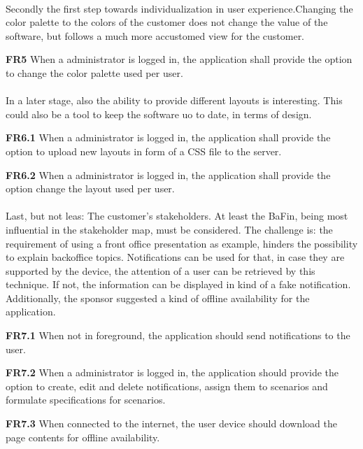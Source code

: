 \paragraph{} Secondly the first step towards individualization in user experience.Changing the color palette to the colors of the customer does not change the value of the software, but follows a much more accustomed view for the customer.

\begin{closeItem}
     \item [\textbf{FR5}] When a administrator is logged in, the application shall provide the option to change the color palette used per user.
\end{closeItem}

\paragraph{} In a later stage, also the ability to provide different layouts is interesting. This could also be a tool to keep the software uo to date, in terms of design. 

\begin{closeItem}
      \item [\textbf{FR6.1}] When a administrator is logged in, the application shall provide the option to upload new layouts in form of a CSS file to the server.
     \item [\textbf{FR6.2}] When a administrator is logged in, the application shall provide the option change the layout used per user.
\end{closeItem}

\paragraph{} Last, but not leas: The customer's stakeholders. At least the BaFin, being most influential in the stakeholder map, must be considered. The challenge is: the requirement of using a front office presentation as example, hinders the possibility to explain backoffice topics. Notifications can be used for that, in case they are supported by the device, the attention of a user can be retrieved by this technique. If not, the information can be displayed in kind of a fake notification. Additionally, the sponsor suggested a kind of offline availability for the application.

\begin{closeItem}
      \item [\textbf{FR7.1}] When not in foreground, the application should send notifications to the user.
      \item [\textbf{FR7.2}] When a administrator is logged in, the application should provide the option to create, edit and delete notifications, assign them to scenarios and formulate specifications for scenarios.
      \item [\textbf{FR7.3}] When connected to the internet, the user device should download the page contents for offline availability.
      
\end{closeItem}

